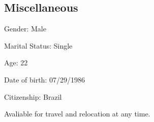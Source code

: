 \documentclass[margin,line]{resume}
\begin{document}
\begin{resume}
		
		

    \section{\mysidestyle Miscellaneous}
     \begin {list1}
     	\item[] Gender: Male
     	\item[] Marital Status: Single
     	\item[] Age: 22
     	\item[] Date of birth: 07/29/1986
     	\item[] Citizenship: Brazil
      \item[]
      \item[] Avaliable for travel and relocation at any time.
     \end{list1}
   
   


\end{resume}
\end{document}
